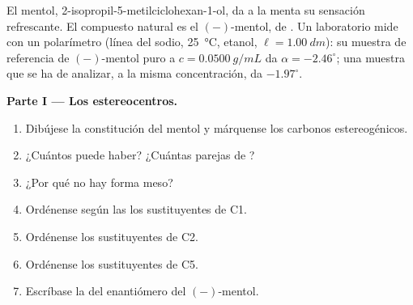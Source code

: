 \begin{problem}
\label{pb:b1:stereochemistry-in-depth:1}
El mentol, 2-isopropil-5-metilciclohexan-1-ol, da a la menta su sensación
refrescante. El compuesto natural es el $(-)$-mentol, de 
. Un laboratorio mide con un polarímetro (línea del sodio,
\qty{25}{\celsius}, etanol, $\ell = \qty{1.00}{dm}$): su muestra de
referencia de $(-)$-mentol puro a $c = \qty{0.0500}{g/mL}$ da $\alpha =
-2.46^\circ$; una muestra que se ha de analizar, a la misma
concentración, da $-1.97^\circ$.

\medskip
\noindent\textbf{Parte I --- Los estereocentros.}
\begin{enumerate}
  \item Dibújese la constitución del mentol y márquense los carbonos
        estereogénicos.
  \item ¿Cuántos  puede haber? ¿Cuántas parejas de
        ?
  \item ¿Por qué no hay forma meso?
  \item Ordénense según las  los sustituyentes de C1.
  \item Ordénense los sustituyentes de C2.
  \item Ordénense los sustituyentes de C5.
  \item Escríbase la  del enantiómero del $(-)$-mentol.
\end{enumerate}


\end{problem}
